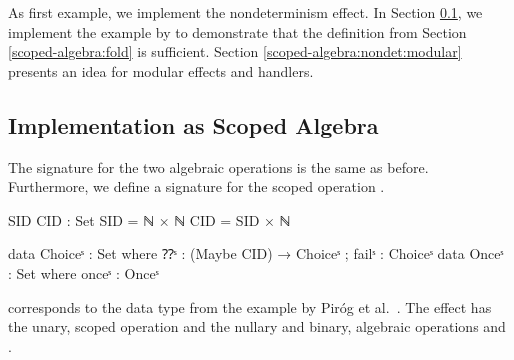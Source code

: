 As first example, we implement the nondeterminism effect.
In Section \ref{scoped-algebra:nondet:scoped-algebra}, we implement the example
by \textcite{DBLP:conf/lics/PirogSWJ18} to demonstrate that the
 definition from Section \ref{scoped-algebra:fold} is
sufficient.
Section \ref{scoped-algebra:nondet:modular} presents an idea for modular effects
and handlers.

\subsection{Implementation as Scoped Algebra}
\label{scoped-algebra:nondet:scoped-algebra}
The signature for the two algebraic operations is the same as before.
Furthermore, we define a signature for the scoped operation .

\begin{code}[hide]
SID CID : Set
SID = ℕ × ℕ
CID = SID × ℕ
\end{code}
\begin{code}
data Choiceˢ  : Set where ⁇ˢ : (Maybe CID) → Choiceˢ ; failˢ : Choiceˢ
data Onceˢ    : Set where onceˢ : Onceˢ
\end{code}
 corresponds to the data type from the example by Piróg et
al.~\cite[sec.~6]{DBLP:conf/lics/PirogSWJ18}.
The effect has the unary, scoped operation  and the nullary
and binary, algebraic operations  and .

